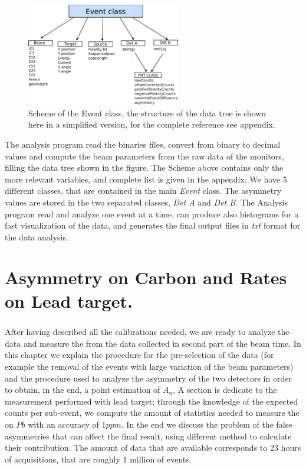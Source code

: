 \begin{figure}[hbtp]
\centering
\includegraphics[width = 0.6\textwidth]{Analysis/EventClass.pdf}
\caption{Scheme of the Event class, the structure of the data tree is shown here in a simplified version, for the complete reference see appendix.}
\end{figure}

The analysis program read the binaries files, convert from binary to decimal values and compute the beam parameters from the raw data of the monitors,   filling the data tree shown in the figure. The Scheme above contains only the more relevant variables, and complete list is given in the appendix. We have 5 different classes, that are contained in the main \textit{Event} class. The asymmetry values are stored in the two separated classes, \textit{Det A} and \textit{Det B}. The Analysis program read and analyze one event at a time, can produce also histograms for a fast visualization of the data, and generates the final output files in \textit{txt} format for the data analysis.  

\chapter{Asymmetry on Carbon and Rates on Lead target.}

\paragraph{}
After having described all the calibrations needed, we are ready to analyze the data and measure the \transv from the data collected in second part of the beam time. In this chapter we explain the procedure for the pre-selection of the data (for example the removal of the events with large variation of the beam parameters) and the procedure used to analyze the asymmetry of the two detectors in order to obtain, in the end, a point estimation of $A_{n}$. A section is dedicate to the measurement performed with lead target; through the knowledge of the expected counts per sub-event, we compute the amount of statistics needed to measure the \transv on $Pb$ with an accuracy of $1 ppm$. In the end we discuss the problem of the false asymmetries that can affect the final result, using different method to calculate their contribution.
The amount of data that are available corresponds to 23 hours of acquisitions, that are roughly 1 million of events. 

